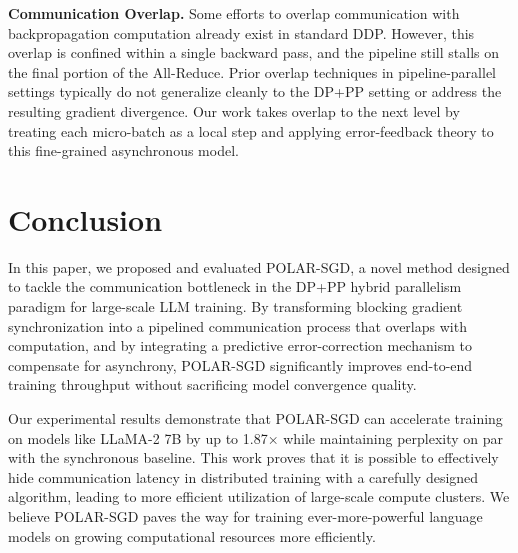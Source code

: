 \documentclass{article}
\theoremstyle{plain}
\theoremstyle{definition}
\theoremstyle{remark}
\begin{document}
    \textbf{Communication Overlap.} 
    Some efforts to overlap communication with backpropagation computation already exist in standard DDP. However, this overlap is confined within a single backward pass, and the pipeline still stalls on the final portion of the All-Reduce. Prior overlap techniques in pipeline-parallel settings typically do not generalize cleanly to the DP+PP setting or address the resulting gradient divergence. Our work takes overlap to the next level by treating each micro-batch as a local step and applying error-feedback theory to this fine-grained asynchronous model.

    \section{Conclusion}
    \label{conclusion}

    In this paper, we proposed and evaluated POLAR-SGD, a novel method designed to tackle the communication bottleneck in the DP+PP hybrid parallelism paradigm for large-scale LLM training. By transforming blocking gradient synchronization into a pipelined communication process that overlaps with computation, and by integrating a predictive error-correction mechanism to compensate for asynchrony, POLAR-SGD significantly improves end-to-end training throughput without sacrificing model convergence quality.

    Our experimental results demonstrate that POLAR-SGD can accelerate training on models like LLaMA-2 7B by up to 1.87× while maintaining perplexity on par with the synchronous baseline. This work proves that it is possible to effectively hide communication latency in distributed training with a carefully designed algorithm, leading to more efficient utilization of large-scale compute clusters. We believe POLAR-SGD paves the way for training ever-more-powerful language models on growing computational resources more efficiently.
\end{document}

